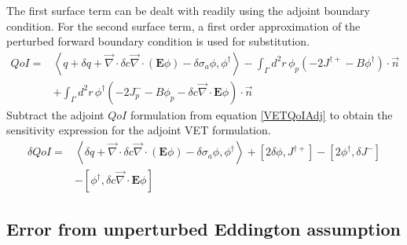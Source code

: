 \documentclass{article}
\newcommand{\bra}{\left\langle}
\newcommand{\ket}{\right\rangle}
\newcommand{\sbra}{\left[}
\newcommand{\sket}{\right]}
\newcommand{\vdiv}{\vec{\nabla} \cdot}
\newcommand{\Edd}{\mathbf{E}}
\newcommand{\siga}{\sigma_a}
\newcommand{\isigt}{c}
\newcommand{\scalSource}{q}
\newcommand{\qoi}{QoI}
\begin{document}
The first surface term can be dealt with readily using the adjoint boundary condition. For the second surface term, a first order approximation of the perturbed forward boundary condition is used for substitution.
\begin{equation}
\label{QoIVETAdj}
\begin{split}
\qoi =& \bra \scalSource + \delta \scalSource + \vdiv \delta \isigt \vdiv \left( \Edd \phi \right) - \delta \siga \phi, \phi^\dag \ket - \int_\Gamma d^2 r \, \phi_p \left( - 2J^{\dag +} - B \phi^\dag \right) \cdot \vec{n} 
\\ &+ \int_\Gamma d^2 r \, \phi^\dag \left( - 2J_p^- - B \phi_p - \delta \isigt \vdiv \Edd \phi \right) \cdot \vec{n} 
\end{split}
\end{equation}
Subtract the adjoint $\qoi$ formulation from equation \ref{VETQoIAdj} to obtain the sensitivity expression for the adjoint VET formulation.
\begin{equation}
\label{SensVETAdjNoBC}
\begin{split}
\delta \qoi =& \bra \delta \scalSource + \vdiv \delta \isigt \vdiv \left( \Edd \phi \right) - \delta \siga \phi, \phi^\dag \ket + \sbra 2\delta \phi, J^{\dag +} \sket  - \sbra 2\phi^\dag, \delta J^- \sket
\\ &- \sbra \phi^\dag, \delta \isigt \vdiv \Edd \phi \sket
\end{split}
\end{equation}


\subsection{Error from unperturbed Eddington assumption}
\end{document}
